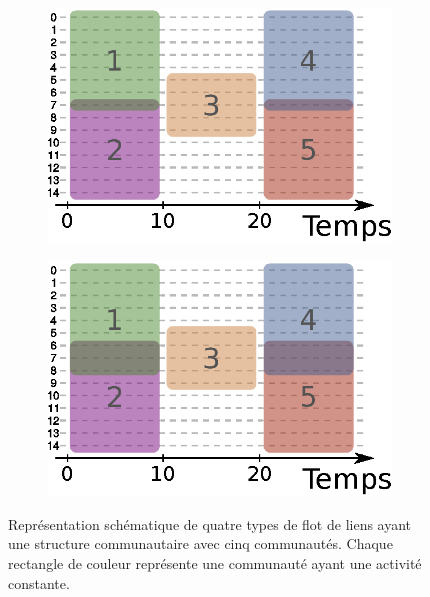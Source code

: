 \begin{figure}
	\begin{subfigure}{0.3\textwidth}
		\includegraphics[width=\textwidth]{img/Qualite/topologie3.eps}
		\caption{}
		\label{fig:versqualite_gen_test3}
	\end{subfigure}\hspace*{0.1\textwidth}
	\begin{subfigure}{0.3\textwidth}
		\includegraphics[width=\textwidth]{img/Qualite/topologie4.eps}
		\caption{}
		\label{fig:versqualite_gen_test4}
	\end{subfigure}	
	\caption{Représentation schématique de quatre types de flot de liens ayant une structure communautaire avec cinq communautés.
	Chaque rectangle de couleur représente une communauté ayant une activité constante.}
	\label{fig:versqualite_gen_test}
\end{figure}

